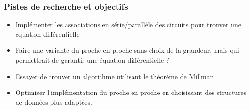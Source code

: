 \documentclass{beamer}
\begin{document}
    \begin{frame}
        \frametitle{Pistes de recherche et objectifs}

        \begin{itemize}
            \item Implémenter les associations en série/parallèle des circuits
                pour trouver une équation différentielle
            \pause
            \item Faire une variante du proche en proche sans choix de la
                grandeur, mais qui permettrait de garantir une équation
                différentielle ?
            \pause
            \item Essayer de trouver un algorithme utilisant le théorème de 
                Millman
            \pause
            \item Optimiser l'implémentation du proche en proche en choisissant
                des structures de données plus adaptées.
        \end{itemize}
    \end{frame}
\end{document}
